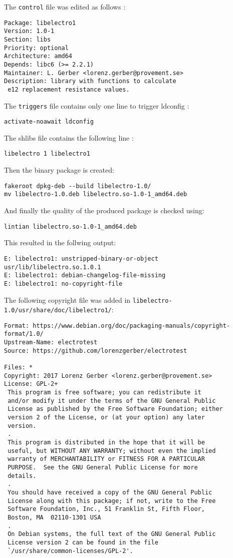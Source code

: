 \documentclass[a4paper,11pt,twoside]{article}
\begin{document}
The \verb+control+ file was edited as follows \cite{controlfiles}:
\begin{verbatim}
Package: libelectro1
Version: 1.0-1
Section: libs
Priority: optional
Architecture: amd64
Depends: libc6 (>= 2.2.1)
Maintainer: L. Gerber <lorenz.gerber@provement.se>
Description: library with functions to calculate
 e12 replacement resistance values.
\end{verbatim}

The \verb+triggers+ file contains only one line to trigger
ldconfig \cite{debShlibs}:
\begin{verbatim}
activate-noawait ldconfig
\end{verbatim}

The shlibs file contains the following line \cite[8.6.4.2.]{debShlibs}:
\begin{verbatim}
libelectro 1 libelectro1
\end{verbatim}
Then the binary package is created:
\begin{verbatim}
fakeroot dpkg-deb --build libelectro-1.0/
mv libelectro-1.0.deb libelectro.so-1.0-1_amd64.deb
\end{verbatim}

And finally the quality of the produced package is checked using:
\begin{verbatim}
lintian libelectro.so-1.0-1_amd64.deb
\end{verbatim}

This resulted in the follwing output:
\begin{verbatim}
E: libelectro1: unstripped-binary-or-object usr/lib/libelectro.so.1.0.1
E: libelectro1: debian-changelog-file-missing
E: libelectro1: no-copyright-file
\end{verbatim}

The following copyright file was added in
\verb+libelectro-1.0/usr/share/doc/libelectro1/+:
\begin{verbatim}
Format: https://www.debian.org/doc/packaging-manuals/copyright-format/1.0/
Upstream-Name: electrotest
Source: https://github.com/lorenzgerber/electrotest

Files: *
Copyright: 2017 Lorenz Gerber <lorenz.gerber@provement.se>
License: GPL-2+
 This program is free software; you can redistribute it
 and/or modify it under the terms of the GNU General Public
 License as published by the Free Software Foundation; either
 version 2 of the License, or (at your option) any later
 version.
 .
 This program is distributed in the hope that it will be
 useful, but WITHOUT ANY WARRANTY; without even the implied
 warranty of MERCHANTABILITY or FITNESS FOR A PARTICULAR
 PURPOSE.  See the GNU General Public License for more
 details.
 .
 You should have received a copy of the GNU General Public
 License along with this package; if not, write to the Free
 Software Foundation, Inc., 51 Franklin St, Fifth Floor,
 Boston, MA  02110-1301 USA
 .
 On Debian systems, the full text of the GNU General Public
 License version 2 can be found in the file
 `/usr/share/common-licenses/GPL-2'.
 \end{verbatim}




\end{document}

